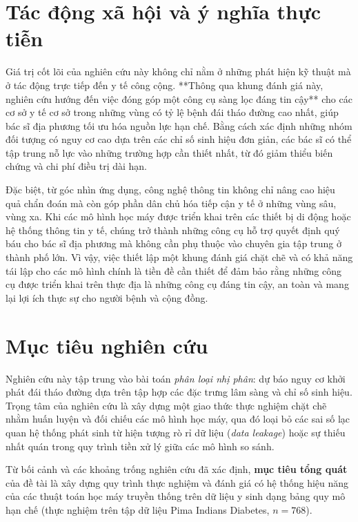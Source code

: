 \documentclass[14pt,a4paper]{extreport}
\begin{document}
\section{Tác động xã hội và ý nghĩa thực tiễn}

Giá trị cốt lõi của nghiên cứu này không chỉ nằm ở những phát hiện kỹ thuật mà ở tác động trực tiếp đến y tế công cộng. **Thông qua khung đánh giá này, nghiên cứu hướng đến việc đóng góp một công cụ sàng lọc đáng tin cậy** cho các cơ sở y tế cơ sở trong những vùng có tỷ lệ bệnh đái tháo đường cao nhất, giúp bác sĩ địa phương tối ưu hóa nguồn lực hạn chế. Bằng cách xác định những nhóm đối tượng có nguy cơ cao dựa trên các chỉ số sinh hiệu đơn giản, các bác sĩ có thể tập trung nỗ lực vào những trường hợp cần thiết nhất, từ đó giảm thiểu biến chứng và chi phí điều trị dài hạn.

Đặc biệt, từ góc nhìn ứng dụng, công nghệ thông tin không chỉ nâng cao hiệu quả chẩn đoán mà còn góp phần dân chủ hóa tiếp cận y tế ở những vùng sâu, vùng xa. Khi các mô hình học máy được triển khai trên các thiết bị di động hoặc hệ thống thông tin y tế, chúng trở thành những công cụ hỗ trợ quyết định quý báu cho bác sĩ địa phương mà không cần phụ thuộc vào chuyên gia tập trung ở thành phố lớn. Vì vậy, việc thiết lập một khung đánh giá chặt chẽ và có khả năng tái lập cho các mô hình chính là tiền đề cần thiết để đảm bảo rằng những công cụ được triển khai trên thực địa là những công cụ đáng tin cậy, an toàn và mang lại lợi ích thực sự cho người bệnh và cộng đồng.

\section{Mục tiêu nghiên cứu}
Nghiên cứu này tập trung vào bài toán \emph{phân loại nhị phân}: dự báo nguy cơ khởi phát đái tháo đường dựa trên tập hợp các đặc trưng lâm sàng và chỉ số sinh hiệu. Trọng tâm của nghiên cứu là xây dựng một giao thức thực nghiệm chặt chẽ nhằm huấn luyện và đối chiếu các mô hình học máy, qua đó loại bỏ các sai số lạc quan hệ thống phát sinh từ hiện tượng rò rỉ dữ liệu (\textit{data leakage}) hoặc sự thiếu nhất quán trong quy trình tiền xử lý giữa các mô hình so sánh.

Từ bối cảnh và các khoảng trống nghiên cứu đã xác định, \textbf{mục tiêu tổng quát} của đề tài là xây dựng quy trình thực nghiệm và đánh giá có hệ thống hiệu năng của các thuật toán học máy truyền thống trên dữ liệu y sinh dạng bảng quy mô hạn chế (thực nghiệm trên tập dữ liệu Pima Indians Diabetes, $n=768$).
\end{document}
